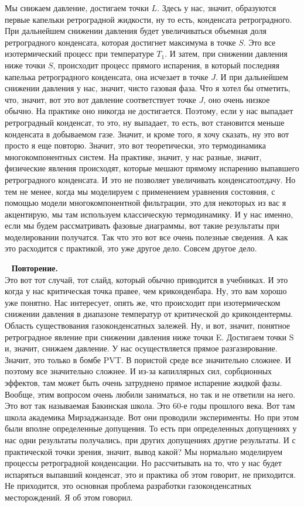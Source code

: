 \documentclass[main.tex]{subfiles}
\begin{document}
Мы снижаем давление, достигаем точки $L$.
Здесь у нас, значит, образуются первые капельки ретроградной жидкости, ну то есть, конденсата ретроградного.
При дальнейшем снижении давления будет увеличиваться объемная доля ретроградного конденсата, которая достигнет максимума в точке $S$.
Это все изотермический процесс при температуре $T_1$.
И затем, при снижении давления ниже точки $S$, происходит процесс прямого испарения, в который последняя капелька ретроградного конденсата, она исчезает в точке $J$.
И при дальнейшем снижении давления у нас, значит, чисто газовая фаза.
Что я хотел бы отметить, что, значит, вот это вот давление соответствует точке $J$, оно очень низкое обычно.
На практике оно никогда не достигается.
Поэтому, если у нас выпадает ретроградный конденсат, то это, ну выпадает, то есть, вот становится меньше конденсата в добываемом газе.
Значит, и кроме того, я хочу сказать, ну это вот просто я еще повторю.
Значит, это вот теоретически, это термодинамика многокомпонентных систем.
На практике, значит, у нас разные, значит, физические явления происходят, которые мешают прямому испарению выпавшего ретроградного конденсата.
И это не позволяет увеличивать конденсатоотдачу.
Но тем не менее, когда мы моделируем с применением уравнения состояния, с помощью модели многокомпонентной фильтрации, это для некоторых из вас я акцентирую, мы там используем классическую термодинамику.
И у нас именно, если мы будем рассматривать фазовые диаграммы, вот такие результаты при моделировании получатся.
Так что это вот все очень полезные сведения.
А как это расходится с практикой, это уже другое дело.
Совсем другое дело.

\ \newline
\textbf{Повторение.}\\
Это вот тот случай, тот слайд, который обычно приводится в учебниках.
И это когда у нас критическая точка правее, чем криконденбара.
Ну, это вам хорошо уже понятно.
Нас интересует, опять же, что происходит при изотермическом снижении давления в диапазоне температур от критической до крикондентермы.
Область существования газоконденсатных залежей.
Ну, и вот, значит, понятное ретроградное явление при снижении давления ниже точки E.
Достигаем точки S и, значит, снижаем давление.
У нас осуществляется прямое разгазирование.
Значит, это только в бомбе PVT.
В пористой среде все значительно сложнее.
И поэтому все значительно сложнее.
И из-за капиллярных сил, сорбционных эффектов, там может быть очень затруднено прямое испарение жидкой фазы.
Вообще, этим вопросом очень любили заниматься, но так и не ответили на него.
Это вот так называемая Бакинская школа.
Это 60-е годы прошлого века.
Вот там школа академика Мирзаджанзаде.
Вот они проводили эксперименты.
Но при этом были вполне определенные допущения.
То есть при определенных допущениях у нас одни результаты получались, при других допущениях другие результаты.
И с практической точки зрения, значит, вывод какой?
Мы нормально моделируем процессы ретроградной конденсации.
Но рассчитывать на то, что у нас будет испаряться выпавший конденсат, это и практика об этом говорит, не приходится.
Не приходится, это основная проблема разработки газоконденсатных месторождений.
Я об этом говорил.
\end{document}
